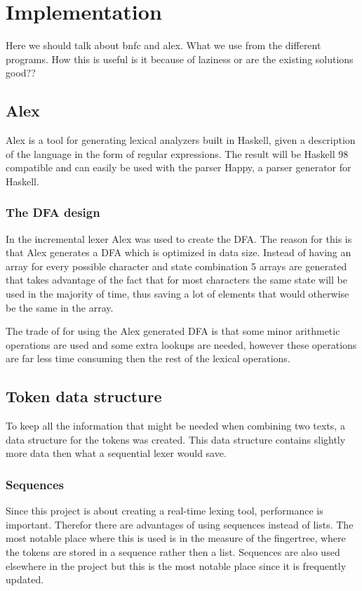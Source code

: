 \chapter{Implementation}
Here we should talk about bnfc and
alex. What we use from the different programs. How this is useful
is it because of laziness or are the existing solutions good??

\section{Alex}
Alex is a tool for generating lexical analyzers built in Haskell, given a
description of the language in the form of regular expressions. The result will
be Haskell 98 compatible and can easily be used with the parser Happy, a parser
generator for Haskell.
\subsection{The DFA design}
In the incremental lexer Alex was used to create the DFA. The reason for this is
that Alex generates a DFA which is optimized in data size. Instead of having an
array for every possible character and state combination 5 arrays are generated
that takes advantage of the fact that for most characters the same state will be
used in the majority of time, thus saving a lot of elements that would
otherwise be the same in the array.

The trade of for using the Alex generated DFA is that some minor arithmetic
operations are used and some extra lookups are needed, however these operations
are far less time consuming then the rest of the lexical operations.

\section{Token data structure}
To keep all the information that might be needed when combining two texts, a data
structure for the tokens was created. This data structure contains slightly more
data then what a sequential lexer would save.
\subsection{Sequences}
Since this project is about creating a real-time lexing tool, performance is
important. Therefor there are advantages of using sequences instead of lists.
The most notable place where this is used is in the measure of the fingertree,
where the tokens are stored in a sequence rather then a list. Sequences are also
used elsewhere in the project but this is the most notable place since it is
frequently updated.
